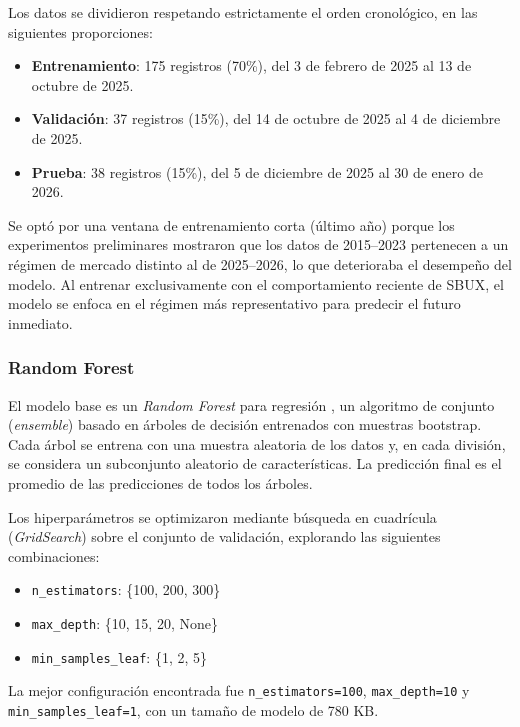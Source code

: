 \documentclass[12pt,a4paper]{article}
\begin{document}
Los datos se dividieron respetando estrictamente el orden cronológico, en las siguientes proporciones:

\begin{itemize}
    \item \textbf{Entrenamiento}: 175 registros (70\%), del 3 de febrero de 2025 al 13 de octubre de 2025.
    \item \textbf{Validación}: 37 registros (15\%), del 14 de octubre de 2025 al 4 de diciembre de 2025.
    \item \textbf{Prueba}: 38 registros (15\%), del 5 de diciembre de 2025 al 30 de enero de 2026.
\end{itemize}

Se optó por una ventana de entrenamiento corta (último año) porque los experimentos preliminares mostraron que los datos de 2015--2023 pertenecen a un régimen de mercado distinto al de 2025--2026, lo que deterioraba el desempeño del modelo. Al entrenar exclusivamente con el comportamiento reciente de SBUX, el modelo se enfoca en el régimen más representativo para predecir el futuro inmediato.

\subsubsection{Random Forest}

El modelo base es un \textit{Random Forest} para regresión \cite{breiman2001random}, un algoritmo de conjunto (\textit{ensemble}) basado en árboles de decisión entrenados con muestras bootstrap. Cada árbol se entrena con una muestra aleatoria de los datos y, en cada división, se considera un subconjunto aleatorio de características. La predicción final es el promedio de las predicciones de todos los árboles.

Los hiperparámetros se optimizaron mediante búsqueda en cuadrícula (\textit{GridSearch}) sobre el conjunto de validación, explorando las siguientes combinaciones:

\begin{itemize}
    \item \texttt{n\_estimators}: \{100, 200, 300\}
    \item \texttt{max\_depth}: \{10, 15, 20, None\}
    \item \texttt{min\_samples\_leaf}: \{1, 2, 5\}
\end{itemize}

La mejor configuración encontrada fue \texttt{n\_estimators=100}, \texttt{max\_depth=10} y \texttt{min\_samples\_leaf=1}, con un tamaño de modelo de 780 KB.
\end{document}
